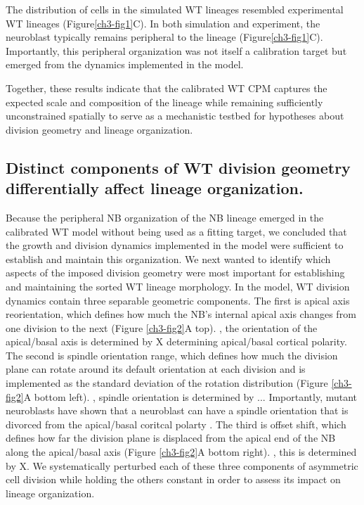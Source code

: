 The distribution of cells in the simulated WT lineages resembled experimental WT lineages (Figure\ref{ch3-fig1}C).
In both simulation and experiment, the neuroblast typically remains peripheral to the lineage (Figure\ref{ch3-fig1}C).
Importantly, this peripheral organization was not itself a calibration target but emerged from the dynamics implemented in the model.

Together, these results indicate that the calibrated WT CPM captures the expected scale and composition of the lineage while remaining sufficiently unconstrained spatially to serve as a mechanistic testbed for hypotheses about division geometry and lineage organization.

\subsection{Distinct components of WT division geometry differentially affect lineage organization.}

Because the peripheral NB organization of the NB lineage emerged in the calibrated WT model without being used as a fitting target, we concluded that the growth and division dynamics implemented in the model were sufficient to establish and maintain this organization.
We next wanted to identify which aspects of the imposed division geometry were most important for establishing and maintaining the sorted WT lineage morphology.
In the model, WT division dynamics contain three separable geometric components.
The first is apical axis reorientation, which defines how much the NB's internal apical axis changes from one division to the next (Figure \ref{ch3-fig2}A top).
\invivo, the orientation of the apical/basal axis is determined by X determining apical/basal cortical polarity.
The second is spindle orientation range, which defines how much the division plane can rotate around its default orientation at each division and is implemented as the standard deviation of the rotation distribution (Figure \ref{ch3-fig2}A bottom left).
\invivo, spindle orientation is determined by ... Importantly, mutant neuroblasts have shown that a neuroblast can have a spindle orientation that is divorced from the apical/basal coritcal polarty \cite{cabernard_2009_apicalbasalspindlea}.
The third is offset shift, which defines how far the division plane is displaced from the apical end of the NB along the apical/basal axis (Figure \ref{ch3-fig2}A bottom right).
\invivo, this is determined by X.
We systematically perturbed each of these three components of asymmetric cell division while holding the others constant in order to assess its impact on lineage organization.

